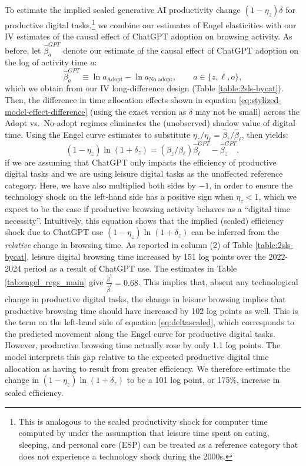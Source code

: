 \documentclass[12pt]{article}
\begin{document}
 To estimate the implied scaled generative AI productivity change $(1-\eta_z)\delta$ for productive digital tasks,\footnote{This is analogous to the scaled productivity shock for computer time computed by \cite{aguiar2021} under the assumption that leisure time spent on eating, sleeping, and personal care (ESP) can be treated as a reference category that does not experience a technology shock during the 2000s.} we combine our estimates of Engel elasticities with our IV estimates of the causal effect of ChatGPT adoption on browsing activity. 
As before, let $\hat{\beta}^{GPT}_a$ denote our estimate of the causal effect of ChatGPT adoption on the log of activity time $a$:
\begin{equation}
    \hat{\beta}^{GPT}_a \equiv \ln a_{\text{Adopt}} - \ln a_{\text{No adopt}},
    \qquad a \in \{z,\ell,o\},
\end{equation}
which we obtain from our IV long-difference design (Table \ref{table:2sls-bycat}).  Then, the difference in time allocation effects shown in equation \ref{eq:stylized-model-effect-difference} (using the exact version as $\delta$ may not be small) across the Adopt vs.\ No-adopt
regimes eliminates the (unobserved) shadow value of digital time. Using the Engel curve estimates to substitute $\eta_z / \eta_{\ell} = \hat{\beta}_z / \hat{\beta}_{\ell}$, then yields:
\begin{equation} \label{eq:deltascaled}
    (1- \eta_z)\ln(1 + \delta_z)
    =   (\beta_z / \beta_{\ell})\hat{\beta}^{GPT}_\ell - \hat{\beta}^{GPT}_z,
\end{equation}
if we are assuming that ChatGPT only impacts the efficiency of productive digital tasks and we are using leisure digital tasks as the unaffected reference category.
Here, we have also multiplied both sides by $-1$, in order to ensure the technology shock on the left-hand side has a positive sign when $\eta_z<1$, which we expect to be the case if productive browsing activity behaves as a ``digital time necessity''.
Intuitively, this equation shows that the implied (scaled) efficiency shock due to ChatGPT use  $(1- \eta_z)\ln(1 + \delta_z)$ can be inferred from the \textit{relative} change in browsing time. As reported in column (2) of Table \ref{table:2sls-bycat}, leisure digital browsing time increased by 151 log points over the 2022-2024 period as a result of ChatGPT use. The estimates in Table \ref{tab:engel_regs_main} give $\frac{\hat{\beta}^z}{\hat{\beta}^{\ell}} = 0.68$. This
implies that, absent any technological change in productive digital tasks, the change in leisure browsing implies that  productive browsing time should have increased by 102 log points as well. This is the term on the left-hand side of equation \ref{eq:deltascaled}, which corresponds to the predicted movement along the Engel curve for productive digital tasks. However, productive browsing time actually rose by only 1.1 log points. The model interprets this gap relative to the expected productive digital time allocation as having to result from greater efficiency.  We therefore estimate the change in $(1-\eta_z)\ln(1 + \delta_z)$ to be a 101 log point, or 175\%, increase in scaled efficiency. 
\end{document}
